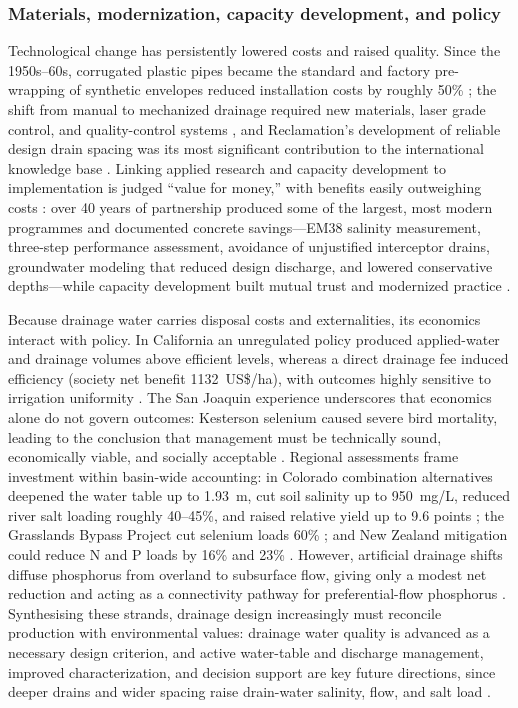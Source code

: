 \documentclass[11pt]{article}
\begin{document}
\subsubsection{Materials, modernization, capacity development, and policy}

Technological change has persistently lowered costs and raised quality. Since the
1950s--60s, corrugated plastic pipes became the standard and factory pre-wrapping
of synthetic envelopes reduced installation costs by roughly 50\%
\parencite{Yannopoulos2020}; the shift from manual to mechanized drainage required
new materials, laser grade control, and quality-control systems
\parencite{Ritzema2006,AbdelDayem2007,Ritzema2007}, and Reclamation's development
of reliable design drain spacing was its most significant contribution to the
international knowledge base \parencite{TeKrony2004}. Linking applied research and
capacity development to implementation is judged ``value for money,'' with
benefits easily outweighing costs \parencite{Ritzema2007}: over 40 years of
partnership produced some of the largest, most modern programmes and documented
concrete savings---EM38 salinity measurement, three-step performance assessment,
avoidance of unjustified interceptor drains, groundwater modeling that reduced
design discharge, and lowered conservative depths---while capacity development
built mutual trust and modernized practice
\parencite{Ritzema2007,Ritzema2008,Ritzema2006}.

Because drainage water carries disposal costs and externalities, its economics
interact with policy. In California an unregulated policy produced applied-water
and drainage volumes above efficient levels, whereas a direct drainage fee induced
efficiency (society net benefit 1132~US\$/ha), with outcomes highly sensitive to
irrigation uniformity \parencite{DINAR1989}. The San Joaquin experience underscores
that economics alone do not govern outcomes: Kesterson selenium caused severe bird
mortality, leading to the conclusion that management must be technically sound,
economically viable, and socially acceptable \parencite{Letey1999}. Regional
assessments frame investment within basin-wide accounting: in Colorado combination
alternatives deepened the water table up to 1.93~m, cut soil salinity up to
950~mg/L, reduced river salt loading roughly 40--45\%, and raised relative yield up
to 9.6 points \parencite{Burkhalter2006}; the Grasslands Bypass Project cut
selenium loads 60\% \parencite{Quinn2009}; and New Zealand mitigation could reduce
N and P loads by 16\% and 23\% \parencite{McDowell2021}. However, artificial
drainage shifts diffuse phosphorus from overland to subsurface flow, giving only a
modest net reduction and acting as a connectivity pathway for preferential-flow
phosphorus \parencite{Lucci2014,Allaire2011,Dadfar2010}. Synthesising
these strands, drainage design increasingly must reconcile production with
environmental values: drainage water quality is advanced as a necessary design
criterion, and active water-table and discharge management, improved
characterization, and decision support are key future directions, since deeper
drains and wider spacing raise drain-water salinity, flow, and salt load
\parencite{Ayars2015,Yannopoulos2020,Ritzema2023}.
\end{document}
